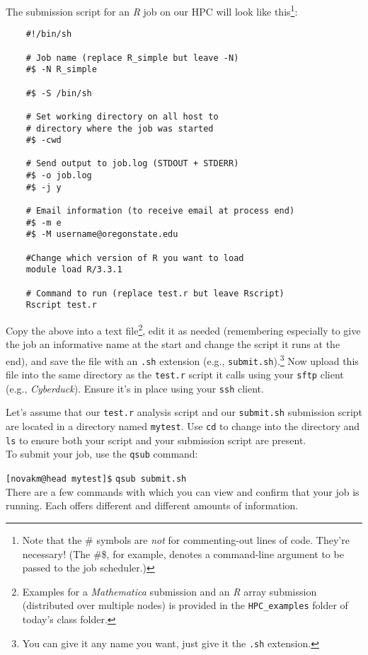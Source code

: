 \documentclass[12pt,letterpaper]{article}
\begin{document}
The submission script for an \emph{R} job on our HPC will look like this\footnote{Note that the \# 
symbols are \emph{not} for commenting-out lines of code.  They're necessary! (The \#\$, for example, 
denotes a command-line argument to be passed to the job 
	scheduler.)}:
\begin{verbatim}
	#!/bin/sh

	# Job name (replace R_simple but leave -N)
	#$ -N R_simple

	#$ -S /bin/sh

	# Set working directory on all host to
	# directory where the job was started
	#$ -cwd

	# Send output to job.log (STDOUT + STDERR)
	#$ -o job.log
	#$ -j y

	# Email information (to receive email at process end)
	#$ -m e
	#$ -M username@oregonstate.edu

	#Change which version of R you want to load
	module load R/3.3.1

	# Command to run (replace test.r but leave Rscript)
	Rscript test.r
\end{verbatim}

Copy the above into a text file\footnote{Examples for a \emph{Mathematica} submission and an 
\emph{R} array submission (distributed over multiple nodes) is provided in the \texttt{HPC\_examples} 
folder of today's class folder.}, edit it as needed (remembering especially to give the job an informative 
name at the start and change the script it runs at the end), and save the file with an \texttt{.sh} extension 
(e.g., \texttt{submit.sh}).\footnote{You can give it any name you want, just give it the \texttt{.sh} 
extension.}
Now upload this file into the same directory as the \texttt{test.r} script it calls using your \texttt{sftp} client (e.g., \emph{Cyberduck}).
Ensure it's in place using your \texttt{ssh} client.

Let's assume that our \texttt{test.r} analysis script and our \texttt{submit.sh} submission script are located in a directory named \texttt{mytest}.
Use \texttt{cd} to change into the directory and \texttt{ls} to ensure both your script and your submission script are present.\\

\noindent
To submit your job, use the \texttt{qsub} command:

\texttt{[novakm@head mytest]\$} \texttt{qsub submit.sh}
\\

\noindent
There are a few commands with which you can view and confirm that your job is running.
Each offers different and different amounts of information.
\end{document}
